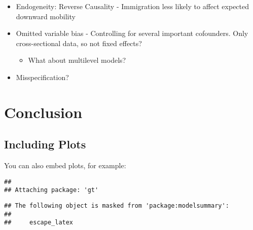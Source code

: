 \documentclass[
  11pt,
]{article}
\providecommand{\tightlist}{%
  \setlength{\itemsep}{0pt}\setlength{\parskip}{0pt}}
\begin{document}
\begin{itemize}
\item
  Endogeneity: Reverse Causality - Immigration less likely to affect
  expected downward mobility
\item
  Omitted variable bias - Controlling for several important cofounders.
  Only cross-sectional data, so not fixed effects?

  \begin{itemize}
  \tightlist
  \item
    What about multilevel models?
  \end{itemize}
\item
  Misspecification?
\end{itemize}

\hypertarget{conclusion}{%
\section{Conclusion}\label{conclusion}}

\kant[24]

\hypertarget{including-plots}{%
\subsection{Including Plots}\label{including-plots}}

You can also embed plots, for example:

\begin{verbatim}
## 
## Attaching package: 'gt'
\end{verbatim}

\begin{verbatim}
## The following object is masked from 'package:modelsummary':
## 
##     escape_latex
\end{verbatim}
\end{document}
